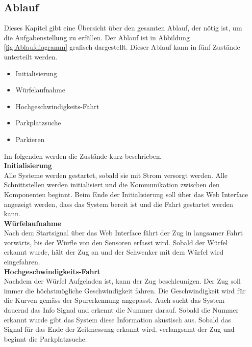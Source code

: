 \documentclass[../../main.tex]{subfiles}
\begin{document}
    \subsection{Ablauf} \label{ablauf}
    Dieses Kapitel gibt eine Übersicht über den gesamten Ablauf, der nötig ist, um die Aufgabenstellung zu erfüllen. Der Ablauf ist in Abbildung \ref{fig:Ablaufdiagramm} grafisch dargestellt. Dieser Ablauf kann in fünf Zustände unterteilt werden.

    \begin{itemize}
        \item Initialisierung
        \item Würfelaufnahme
        \item Hochgeschwindigkeits-Fahrt
        \item Parkplatzsuche
        \item Parkieren
    \end{itemize}

    Im folgenden werden die Zustände kurz beschrieben.\\  

    \textbf{Initialisierung}\\
    Alle Systeme werden gestartet, sobald sie mit Strom versorgt werden. Alle Schnittstellen werden initialisiert und die Kommunikation zwischen den Komponenten beginnt. Beim Ende der Initialisierung soll über das Web Interface angezeigt werden, dass das System bereit ist und die Fahrt gestartet werden kann.\\

    \textbf{Würfelaufnahme}\\
    Nach dem Startsignal über das Web Interface fährt der Zug in langsamer Fahrt vorwärts, bis der Würfle von den Sensoren erfasst wird. Sobald der Würfel erkannt wurde, hält der Zug an und der Schwenker mit dem Würfel wird eingefahren.\\

    \textbf{Hochgeschwindigkeits-Fahrt}\\
    Nachdem der Würfel Aufgeladen ist, kann der Zug beschleunigen. Der Zug soll immer die höchstmögliche Geschwindigkeit fahren. Die Geschwindigkeit wird für die Kurven gemäss der Spurerkennung angepasst. Auch sucht das System dauernd das Info Signal und erkennt die Nummer darauf. Sobald die Nummer erkannt wurde gibt das System diese Information akustisch aus.
    Sobald das Signal für das Ende der Zeitmessung erkannt wird, verlangsamt der Zug und beginnt die Parkplatzsuche.\\
\end{document}
